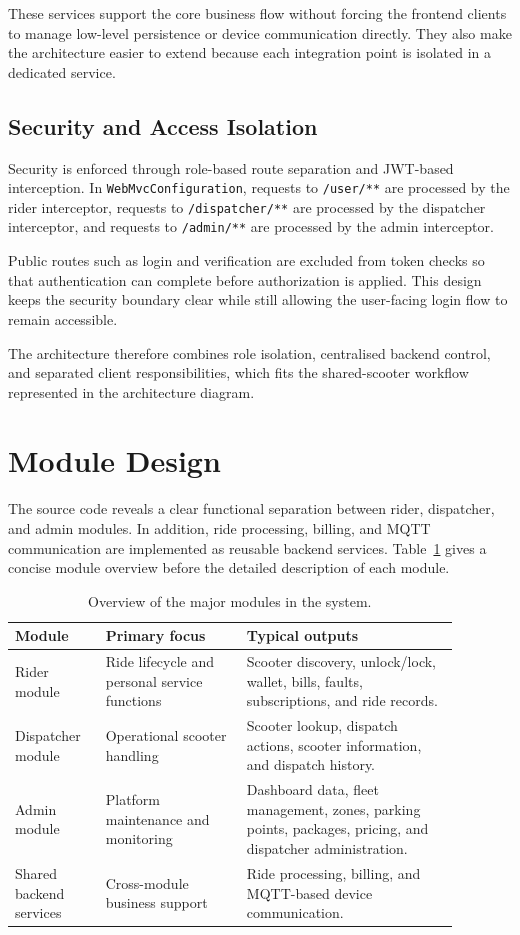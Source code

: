 \documentclass[12pt,a4paper]{article}
\begin{document}
These services support the core business flow without forcing the frontend clients to manage low-level persistence or device communication directly. They also make the architecture easier to extend because each integration point is isolated in a dedicated service.

\subsection{Security and Access Isolation}

Security is enforced through role-based route separation and JWT-based interception. In \texttt{WebMvcConfiguration}, requests to \texttt{/user/**} are processed by the rider interceptor, requests to \texttt{/dispatcher/**} are processed by the dispatcher interceptor, and requests to \texttt{/admin/**} are processed by the admin interceptor.

Public routes such as login and verification are excluded from token checks so that authentication can complete before authorization is applied. This design keeps the security boundary clear while still allowing the user-facing login flow to remain accessible.

The architecture therefore combines role isolation, centralised backend control, and separated client responsibilities, which fits the shared-scooter workflow represented in the architecture diagram.

\section{Module Design}

The source code reveals a clear functional separation between rider, dispatcher, and admin modules. In addition, ride processing, billing, and MQTT communication are implemented as reusable backend services. Table~\ref{tab:module-overview} gives a concise module overview before the detailed description of each module.

\begin{table}[H]
\centering
\begin{tabular}{p{0.18\linewidth} p{0.28\linewidth} p{0.42\linewidth}}
\toprule
\textbf{Module} & \textbf{Primary focus} & \textbf{Typical outputs} \\
\midrule
Rider module & Ride lifecycle and personal service functions & Scooter discovery, unlock/lock, wallet, bills, faults, subscriptions, and ride records. \\
Dispatcher module & Operational scooter handling & Scooter lookup, dispatch actions, scooter information, and dispatch history. \\
Admin module & Platform maintenance and monitoring & Dashboard data, fleet management, zones, parking points, packages, pricing, and dispatcher administration. \\
Shared backend services & Cross-module business support & Ride processing, billing, and MQTT-based device communication. \\
\bottomrule
\end{tabular}
\caption{Overview of the major modules in the system.}
\label{tab:module-overview}
\end{table}
\end{document}
